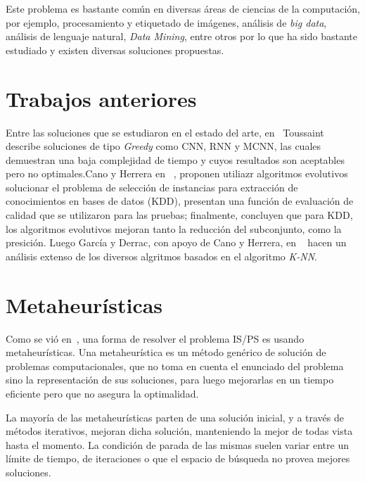 \documentclass{ci5652}
\begin{document}
Este problema es bastante común en diversas áreas de ciencias de la computación, por ejemplo, procesamiento y etiquetado de imágenes, análisis de \textit{big data}, análisis de lenguaje natural, \textit{Data Mining}, entre otros por lo que ha sido bastante estudiado y existen diversas soluciones propuestas.

\section{Trabajos anteriores}
\label{sect:works}

Entre las soluciones que se estudiaron en el estado del arte, en~\cite{toussaint2002proximity} Toussaint describe soluciones de tipo \textit{Greedy} como CNN, RNN y MCNN, las cuales demuestran una baja complejidad de tiempo y cuyos resultados son aceptables pero no optimales.Cano y Herrera en ~\cite{1255391}, proponen utiliazr algoritmos evolutivos solucionar el problema de selección de instancias para extracción de conocimientos en bases de datos (KDD), presentan una función de evaluación de calidad que se utilizaron para las pruebas; finalmente, concluyen que para KDD, los algoritmos evolutivos mejoran tanto la reducción del subconjunto, como la presición. Luego García y Derrac, con apoyo de Cano y Herrera, en ~\cite{garcia2012prototype} hacen un análisis extenso de los diversos algritmos basados en el algoritmo \textit{K-NN}.

\section{Metaheurísticas}
\label{sect:meta}

Como se vió en~\cite{1255391}, una forma de resolver el problema IS/PS es usando metaheurísticas. Una metaheurística es un método genérico de solución de problemas computacionales, que no toma en cuenta el enunciado del problema sino la representación de sus soluciones, para luego mejorarlas en un tiempo eficiente pero que no asegura la optimalidad.

La mayoría de las metaheurísticas parten de una solución inicial, y a través de métodos iterativos, mejoran dicha solución, manteniendo la mejor de todas vista hasta el momento. La condición de parada de las mismas suelen variar entre un límite de tiempo, de iteraciones o que el espacio de búsqueda no provea mejores soluciones.
\end{document}
